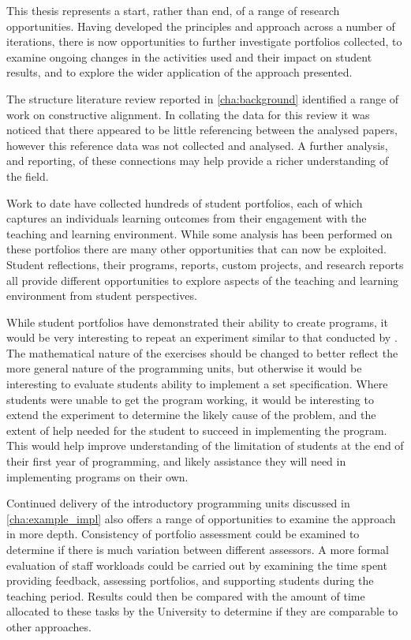 This thesis represents a start, rather than end, of a range of research opportunities. Having developed the principles and approach across a number of iterations, there is now opportunities to further investigate portfolios collected, to examine ongoing changes in the activities used and their impact on student results, and to explore the wider application of the approach presented.

The structure literature review reported in \cref{cha:background} identified a range of work on constructive alignment. In collating the data for this review it was noticed that there appeared to be little referencing between the analysed papers, however this reference data was not collected and analysed. A further analysis, and reporting, of these connections may help provide a richer understanding of the field.

Work to date have collected hundreds of student portfolios, each of which captures an individuals learning outcomes from their engagement with the teaching and learning environment. While some analysis has been performed on these portfolios there are many other opportunities that can now be exploited. Student reflections, their programs, reports, custom projects, and research reports all provide different opportunities to explore aspects of the teaching and learning environment from student perspectives.

While student portfolios have demonstrated their ability to create programs, it would be very interesting to repeat an experiment similar to that conducted by \citet{McCracken:2001}. The mathematical nature of the exercises should be changed to better reflect the more general nature of the programming units, but otherwise it would be interesting to evaluate students ability to implement a set specification. Where students were unable to get the program working, it would be interesting to extend the experiment to determine the likely cause of the problem, and the extent of help needed for the student to succeed in implementing the program. This would help improve understanding of the limitation of students at the end of their first year of programming, and likely assistance they will need in implementing programs on their own. 

Continued delivery of the introductory programming units discussed in \cref{cha:example_impl} also offers a range of opportunities to examine the approach in more depth. Consistency of portfolio assessment could be examined to determine if there is much variation between different assessors. A more formal evaluation of staff workloads could be carried out by examining the time spent providing feedback, assessing portfolios, and supporting students during the teaching period. Results could then be compared with the amount of time allocated to these tasks by the University to determine if they are comparable to other approaches.

